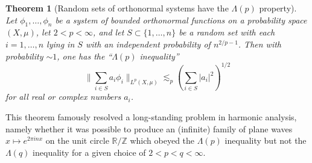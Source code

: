 \documentclass[12pt,a4paper,reqno]{amsart}
\numberwithin{equation}{section}
\theoremstyle{plain}
\newtheorem{theorem}{Theorem}[section]
\theoremstyle{definition}
\newcommand\R{\mathbb{R}}
\newcommand\Z{\mathbb{Z}}
\begin{document}
\begin{theorem}[Random sets of orthonormal systems have the $\Lambda(p)$ property]\label{lambda-p} Let $\phi_1,\dots,\phi_n$ be a system of bounded orthonormal functions on a probability space $(X,\mu)$, let $2 < p < \infty$, and let $S \subset \{1,\dots,n\}$ be a random set with each $i=1,\dots,n$ lying in $S$ with an independent probability of $n^{2/p-1}$.  Then with probability $\sim 1$, one has the ``$\Lambda(p)$ inequality''
$$ \| \sum_{i \in S} a_i \phi_i \|_{L^p(X,\mu)} \lesssim_p (\sum_{i \in S} |a_i|^2)^{1/2}$$
for all real or complex numbers $a_i$.
\end{theorem}

This theorem famously resolved a long-standing problem in harmonic analysis, namely whether it was possible to produce an (infinite) family of plane waves $x \mapsto e^{2\pi i nx}$ on the unit circle $\R/\Z$ which obeyed the $\Lambda(p)$ inequality but not the $\Lambda(q)$ inequality for a given choice of $2 < p < q < \infty$.
\end{document}
